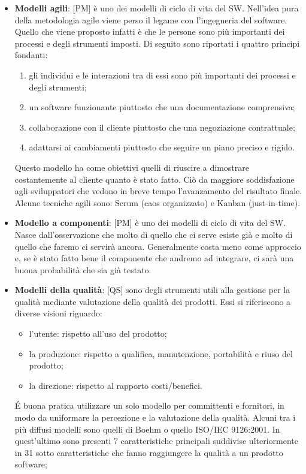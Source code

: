\begin{itemize}
	\item \textbf{Modelli agili}: [PM] è uno dei modelli di ciclo di vita del SW. \newline
Nell'idea pura della metodologia agile viene perso il legame con l'ingegneria del software.
Quello che viene proposto infatti è che le persone sono più importanti dei processi e degli strumenti imposti. Di seguito sono riportati i quattro principi fondanti:
		\begin{enumerate}
			\item gli individui e le interazioni tra di essi sono più importanti dei processi e degli strumenti;
			\item un software funzionante piuttosto che una documentazione comprensiva;
			\item collaborazione con il cliente piuttosto che una negoziazione contrattuale;
			\item adattarsi ai cambiamenti piuttosto che seguire un piano preciso e rigido.
		\end{enumerate}
Questo modello ha come obiettivi quelli di riuscire a dimostrare costantemente al cliente quanto è stato fatto. Ciò da maggiore soddisfazione agli sviluppatori che vedono in breve tempo l'avanzamento del risultato finale. \newline
Alcune tecniche agili sono: Scrum (caos organizzato) e Kanban (just-in-time).

	\item \textbf{Modello a componenti}: [PM] è uno dei modelli di ciclo di vita del SW. Nasce dall'osservazione che molto di quello che ci serve esiste già e molto di quello che faremo ci servirà ancora. \newline
Generalmente costa meno come approccio e, se è stato fatto bene il componente che andremo ad integrare, ci sarà una buona probabilità che sia già testato.

	\item \textbf{Modelli della qualità}: [QS] sono degli strumenti utili alla gestione per la qualità mediante valutazione della qualità dei prodotti. Essi si riferiscono a diverse visioni riguardo:
		\begin{itemize}
			\item l'utente: rispetto all'uso del prodotto;
			\item la produzione: rispetto a qualifica, manutenzione, portabilità e riuso del prodotto;
			\item la direzione: rispetto al rapporto costi/benefici.
		\end{itemize}
		\noindent
		\'E buona pratica utilizzare un solo modello per committenti e fornitori, in modo da uniformare la percezione e la valutazione della qualità. Alcuni tra i più diffusi modelli sono quelli di Boehm o quello ISO/IEC 9126:2001. In quest'ultimo sono presenti 7 caratteristiche principali suddivise ulteriormente in 31 sotto caratteristiche che fanno raggiungere la qualità a un prodotto software;


\end{itemize}
